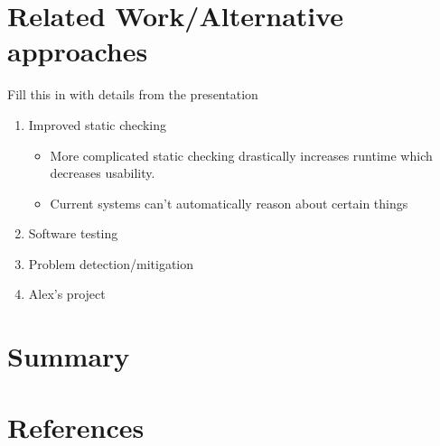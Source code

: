 \documentclass[12pt]{article}
\begin{document}
\section{Related Work/Alternative approaches}
Fill this in with details from the presentation
\begin{enumerate}
    \item Improved static checking
    \begin{itemize}
        \item More complicated static checking drastically increases runtime which decreases usability.
        \item Current systems can't automatically reason about certain things
    \end{itemize}
    
    \item Software testing
    
    \item Problem detection/mitigation
    
    \item Alex's project
    
\end{enumerate}

\section{Summary}

\section{References}
\end{document}
